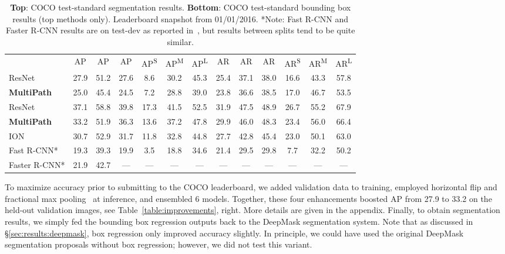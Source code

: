 \documentclass{bmvc2k}
\newcommand{\tss}[1]{\textsuperscript{#1}}
\newcommand{\Caption}[1]{\caption{\small#1}}
\newcommand{\tab}[1]{Table~\ref{table:#1}}
\begin{document}
\begin{table}[t]\centering\scriptsize
\renewcommand\arraystretch{1.1}\renewcommand{\tabcolsep}{.9mm}
\begin{tabular}{l|cccccccccccc}
  & AP & AP & AP & AP\tss{S} & AP\tss{M} & AP\tss{L} &
  AR & AR & AR & AR\tss{S} & AR\tss{M} & AR\tss{L} \\
 \shline
   ResNet \cite{he2015deep} & 27.9 & 51.2 & 27.6 & 8.6 & 30.2 & 45.3 & 25.4 & 37.1 & 38.0 & 16.6 & 43.3 & 57.8\\
   \textbf{MultiPath} & 25.0 & 45.4 & 24.5 & 7.2 & 28.8 & 39.0 & 23.8 & 36.6 & 38.5 & 17.0 & 46.7 & 53.5\\
 \hline
   ResNet \cite{he2015deep}
    & 37.1 & 58.8 & 39.8 & 17.3 & 41.5 & 52.5 & 31.9 & 47.5 & 48.9 & 26.7 & 55.2 & 67.9\\
   \textbf{MultiPath}
    & 33.2 & 51.9 & 36.3 & 13.6 & 37.2 & 47.8 & 29.9 & 46.0 & 48.3 & 23.4 & 56.0 & 66.4\\
   ION \cite{bell15ion}
    & 30.7 & 52.9 & 31.7 & 11.8 & 32.8 & 44.8 & 27.7 & 42.8 & 45.4 & 23.0 & 50.1 & 63.0\\
   Fast R-CNN* \cite{girshick15fastrcnn}
    & 19.3 & 39.3 & 19.9 &  3.5 & 18.8 & 34.6 & 21.4 & 29.5 & 29.8 &  7.7 & 32.2 & 50.2\\
   Faster R-CNN* \cite{RenNIPS15fasterRCNN}
    & 21.9 & 42.7 &  --- &  --- &  --- &  --- &  --- &  --- &  --- &  --- &  --- &  ---\\
\end{tabular}
\Caption{\textbf{Top}: COCO test-standard segmentation results. \textbf{Bottom}: COCO test-standard bounding box results (top methods only). Leaderboard snapshot from 01/01/2016. *Note: Fast R-CNN and Faster R-CNN results are on test-dev as reported in~\cite{RenNIPS15fasterRCNN}, but results between splits tend to be quite similar.}
\label{table:leaderboard}
\end{table}


To maximize accuracy prior to submitting to the COCO leaderboard, we added validation data to training, employed horizontal flip and fractional max pooling~\cite{fmp} at inference, and ensembled 6 models. Together, these four enhancements boosted AP from 27.9 to 33.2 on the held-out validation images, see \tab{improvements}, right. More details are given in the appendix. Finally, to obtain segmentation results, we simply fed the bounding box regression outputs back to the DeepMask segmentation system. Note that as discussed in \S\ref{sec:results:deepmask}, box regression only improved accuracy slightly. In principle, we could have used the original DeepMask segmentation proposals without box regression; however, we did not test this variant.
\end{document}
